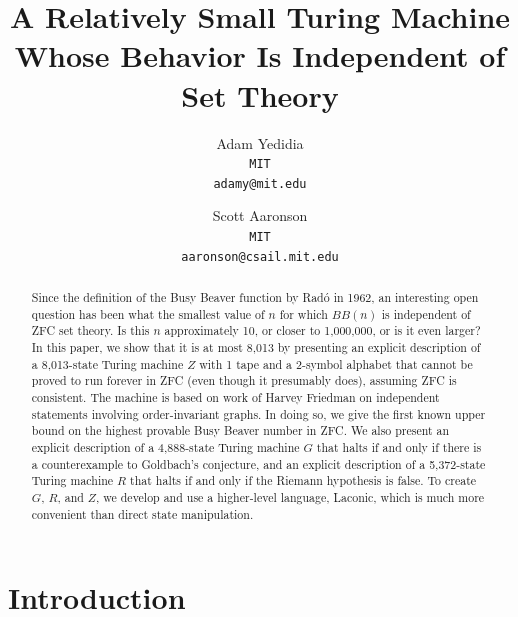 \documentclass[11pt]{article}
\newcommand{\statenumstate}{8,013-state }
\newcommand{\statenum}{8,013 }
\newcommand{\gbstatenumstate}{4,888-state }
\newcommand{\rmstatenumstate}{5,372-state }
\begin{document}
\title{A Relatively Small Turing Machine Whose Behavior Is Independent of Set Theory}
\author{
    Adam Yedidia\\
    \small\texttt{MIT}\\
    \small\texttt{adamy@mit.edu}
    \and
    Scott Aaronson\\
    \small\texttt{MIT}\\
    \small\texttt{aaronson@csail.mit.edu}
}
\maketitle

\begin{abstract}

Since the definition of the Busy Beaver function by Rad\'{o} in 1962, an interesting open question has been what the smallest value of $n$ for which $BB(n)$ is independent of ZFC set theory. Is this $n$ approximately 10, or closer to 1,000,000, or is it even larger? In this paper, we show that it is at most \statenum by presenting an explicit description of a \statenumstate Turing machine $Z$ with 1 tape and a 2-symbol alphabet that cannot be proved to run forever in ZFC (even though it presumably does), assuming ZFC is consistent. The machine is based on work of Harvey Friedman on independent statements involving order-invariant graphs. In doing so, we give the first known upper bound on the highest provable Busy Beaver number in ZFC. We also present an explicit description of a \gbstatenumstate Turing machine $G$ that halts if and only if there is a counterexample to Goldbach's conjecture, and an explicit description of a \rmstatenumstate Turing machine $R$ that halts if and only if the Riemann hypothesis is false. To create $G$, $R$, and $Z$, we develop and use a higher-level language, Laconic, which is much more convenient than direct state manipulation. 

\end{abstract}

\section{Introduction}

\end{document}
